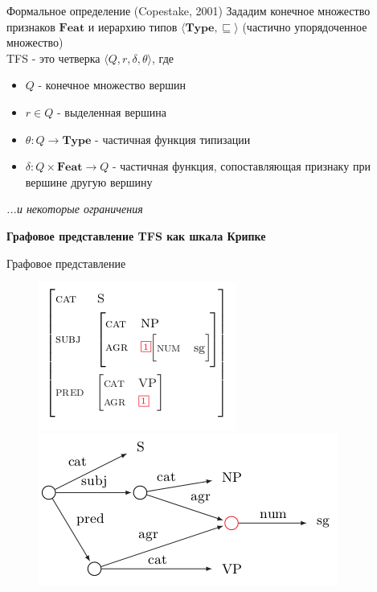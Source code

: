 \documentclass{beamer}
\begin{document}
\begin{frame}{Формальное определение (Copestake, 2001)}
Зададим конечное множество признаков $\textbf{Feat}$ и иерархию типов $\langle \textbf{Type}, \sqsubseteq \rangle$ (частично упорядоченное множество)\\
\bigskip
TFS - это четверка $\langle Q, r, \delta, \theta \rangle$, где
\begin{itemize}
	\item $Q$ - конечное множество вершин
	\item $r \in Q$ - выделенная вершина
	\item $\theta : Q \to \textbf{Type}$ - частичная функция типизации
	\item $\delta : Q \times \textbf{Feat} \to Q$ - частичная функция, сопоставляющая признаку при вершине другую вершину
\end{itemize}
\bigskip
{\footnotesize \textit{...и некоторые ограничения}}
\end{frame}

\begin{frame}{}
\begin{center}
	\textbf{Графовое представление TFS как шкала Крипке}
\end{center}
\end{frame}

\begin{frame}{Графовое представление}
\begin{center}
	\begin{figure}[H]
		\includegraphics[scale=0.5]{tfs_avm.png} 
		\includegraphics[scale=0.5]{tfs_graph.png} 
	\end{figure}
\end{center}
\end{frame}
\end{document}
